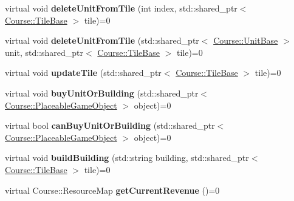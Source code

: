 \begin{DoxyCompactItemize}
\item 
\hypertarget{class_course_1_1i_game_event_handler_ad2adf1d57dc96bdfba849e9aefb73ee6}{virtual void {\bfseries delete\-Unit\-From\-Tile} (int index, std\-::shared\-\_\-ptr$<$ \hyperlink{class_course_1_1_tile_base}{Course\-::\-Tile\-Base} $>$ tile)=0}\label{class_course_1_1i_game_event_handler_ad2adf1d57dc96bdfba849e9aefb73ee6}

\item 
\hypertarget{class_course_1_1i_game_event_handler_a52b26d73c7b3c59d3b5861a7ad328140}{virtual void {\bfseries delete\-Unit\-From\-Tile} (std\-::shared\-\_\-ptr$<$ \hyperlink{class_course_1_1_unit_base}{Course\-::\-Unit\-Base} $>$ unit, std\-::shared\-\_\-ptr$<$ \hyperlink{class_course_1_1_tile_base}{Course\-::\-Tile\-Base} $>$ tile)=0}\label{class_course_1_1i_game_event_handler_a52b26d73c7b3c59d3b5861a7ad328140}

\item 
\hypertarget{class_course_1_1i_game_event_handler_a9c496a0b542ecfce23537fbd0a95a8c4}{virtual void {\bfseries update\-Tile} (std\-::shared\-\_\-ptr$<$ \hyperlink{class_course_1_1_tile_base}{Course\-::\-Tile\-Base} $>$ tile)=0}\label{class_course_1_1i_game_event_handler_a9c496a0b542ecfce23537fbd0a95a8c4}

\item 
\hypertarget{class_course_1_1i_game_event_handler_aaa0d404b6fb9ebbb700ca9364d3cd5cf}{virtual void {\bfseries buy\-Unit\-Or\-Building} (std\-::shared\-\_\-ptr$<$ \hyperlink{class_course_1_1_placeable_game_object}{Course\-::\-Placeable\-Game\-Object} $>$ object)=0}\label{class_course_1_1i_game_event_handler_aaa0d404b6fb9ebbb700ca9364d3cd5cf}

\item 
\hypertarget{class_course_1_1i_game_event_handler_ad27784a9a3e65362c8889c9fa7e0abbf}{virtual bool {\bfseries can\-Buy\-Unit\-Or\-Building} (std\-::shared\-\_\-ptr$<$ \hyperlink{class_course_1_1_placeable_game_object}{Course\-::\-Placeable\-Game\-Object} $>$ object)=0}\label{class_course_1_1i_game_event_handler_ad27784a9a3e65362c8889c9fa7e0abbf}

\item 
\hypertarget{class_course_1_1i_game_event_handler_af7918c95a16eb0f65b19f8fb6d678994}{virtual void {\bfseries build\-Building} (std\-::string building, std\-::shared\-\_\-ptr$<$ \hyperlink{class_course_1_1_tile_base}{Course\-::\-Tile\-Base} $>$ tile)=0}\label{class_course_1_1i_game_event_handler_af7918c95a16eb0f65b19f8fb6d678994}

\item 
\hypertarget{class_course_1_1i_game_event_handler_aecc284039fc48f335bd0dfa32bb90fef}{virtual Course\-::\-Resource\-Map {\bfseries get\-Current\-Revenue} ()=0}\label{class_course_1_1i_game_event_handler_aecc284039fc48f335bd0dfa32bb90fef}


\end{DoxyCompactItemize}
